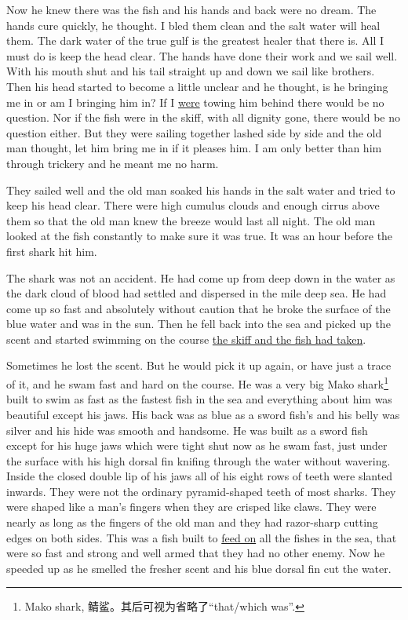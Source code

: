 \documentclass[fontset=ubuntu]{ctexrep}
\begin{document}
Now he knew there was the fish and his hands and back were no dream. The
hands \gls{cure} quickly, he thought. I \gls{bled} them clean and the
salt water will \gls{heal} them. The dark water of the true gulf is the
greatest \gls{healer} that there is. All I must do is keep the head clear.
The hands have done their work and we sail well. With his mouth shut and his
tail straight up and down we sail like brothers. Then his head started to
become a little unclear and he thought, is he bringing me in or am I
bringing him in? If I \uline{were} \gls{towing} him behind there would be no
question. Nor if the fish were in the skiff, with all dignity gone, there
would be no question either. But they were sailing together lashed side by
side and the old man thought, let him bring me in if it pleases him. I am
only better than him through \gls{trickery} and he meant me no \gls{harm}.

They sailed well and the old man \gls{soaked} his hands in the salt water
and tried to keep his head clear. There were high cumulus clouds and enough
cirrus above them so that the old man knew the breeze would last all night.
The old man looked at the fish \gls{constantly} to make sure it was true.
It was an hour before the first shark hit him.

The shark was not an \gls{accident}. He had come up from deep down in the
water as the dark cloud of blood had settled and \gls{dispersed} in the mile
deep sea. He had come up so fast and absolutely without \gls{caution} that
he broke the surface of the blue water and was in the sun. Then he fell back
into the sea and picked up the scent and started swimming on the course \uline{the
skiff and the fish had taken}.

Sometimes he lost the scent. But he would pick it up again, or have just a
\gls{trace} of it, and he swam fast and hard on the course. He was a very
big Mako shark\footnote{Mako shark, 鲭鲨。其后可视为省略了``that/which
  was''.} built to swim as fast as the fastest fish in the sea and
everything about him was beautiful except his jaws. His back was as blue as
a sword fish's and his belly was silver and his hide was smooth and
handsome. He was built as a sword fish except for his huge jaws which were
tight shut now as he swam fast, just under the surface with his high dorsal
fin \gls{knifing} through the water without wavering. Inside the closed
double lip of his jaws all of his eight rows of teeth were slanted
\glspl{inward}. They were not the \gls{ordinary} \gls{pyramid}-shaped teeth
of most sharks. They were shaped like a man's fingers when they are
\gls{crisped} like claws. They were nearly as long as the fingers of the old
man and they had \gls{razor}-sharp cutting edges on both sides. This was a
fish built to \uline{feed on} all the fishes in the sea, that were so fast and
strong and well armed that they had no other enemy. Now he speeded up as he
smelled the fresher scent and his blue dorsal fin cut the water.
\end{document}
